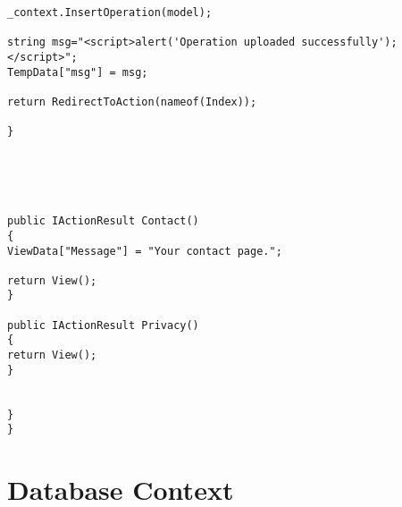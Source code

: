 \begin{lstlisting}
_context.InsertOperation(model);

string msg="<script>alert('Operation uploaded successfully');</script>";
TempData["msg"] = msg;

return RedirectToAction(nameof(Index));

}





public IActionResult Contact()
{
ViewData["Message"] = "Your contact page.";

return View();
}

public IActionResult Privacy()
{
return View();
}


}
}
\end{lstlisting}


\section{Database Context}

